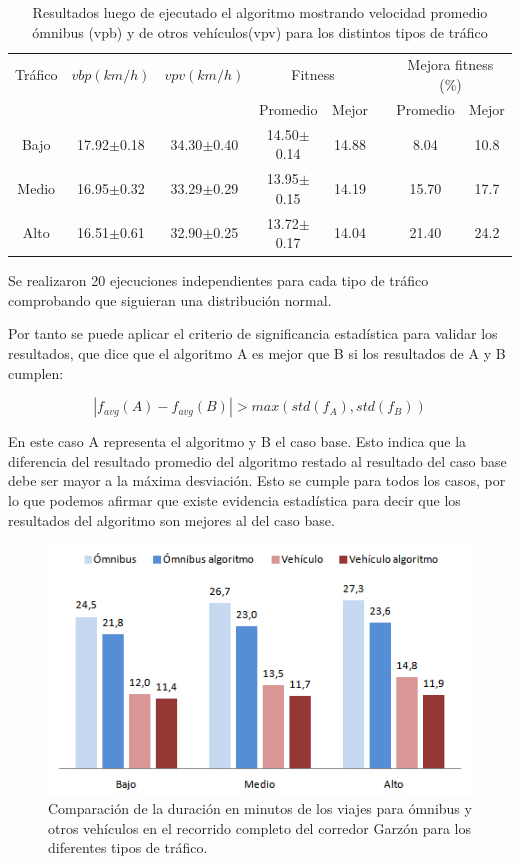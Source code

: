 \begin{table}[H]
	\renewcommand{\arraystretch}{1.2}	
		\centering
	\caption{Resultados luego de ejecutado el algoritmo mostrando velocidad promedio ómnibus (vpb) y  de otros vehículos(vpv) para los distintos tipos de tráfico }
	\label{table:resultado_caso_algoritmo}
	\begin{tabular}{cccccccc}
		\hline 
		Tráfico& 
		$vbp(km/h)$& 
		$vpv(km/h)$&
		\multicolumn{2}{c}{Fitness}&  & 
		\multicolumn{2}{c}{Mejora fitness (\%)}\\  \cline{4-5} \cline{7-8}&     &     & \multicolumn{1}{c}{Promedio} & \multicolumn{1}{c}{Mejor} &  & \multicolumn{1}{c}{Promedio} & \multicolumn{1}{c}{Mejor} \\ \hline
		Bajo & 17.92$\pm$0.18 & 34.30$\pm$0.40 & 14.50$\pm$0.14 & 14.88 & & 8.04 & 10.8  \\
		Medio& 16.95$\pm$0.32 & 33.29$\pm$0.29 & 13.95$\pm$0.15 & 14.19 & & 15.70& 17.7\\ 
		Alto & 16.51$\pm$0.61  & 32.90$\pm$0.25& 13.72$\pm$0.17 & 14.04 & & 21.40& 24.2\\	
		\hline	    
	\end{tabular}
\end{table}

Se realizaron 20 ejecuciones independientes para cada tipo de tráfico comprobando que siguieran una distribución normal.

Por tanto se puede aplicar el criterio de significancia estadística para validar los resultados, que dice que el
algoritmo A es mejor que B si los resultados de A y B cumplen:

\begin{equation}
\label{eq:funcion_significancia}
\left |f_{avg}(A) - f_{avg}(B)  \right | > max(std(f_A),std(f_B))
\end{equation}

En este caso A representa el algoritmo y B el caso base. Esto indica que la diferencia del resultado promedio del algoritmo restado al resultado del caso base debe ser mayor a la máxima desviación.
Esto se cumple para todos los casos, por lo que podemos afirmar que existe evidencia estadística para decir que los resultados del algoritmo son mejores al del caso base.

\begin{figure}[H]
	\centering
	\includegraphics[width=0.8\linewidth]{Figures/duracion_viajes}
	\caption{Comparación de la duración en minutos de los viajes para ómnibus y otros vehículos en el recorrido completo del corredor Garzón para los diferentes tipos de tráfico.}
	\label{fig:duracion_viajes}
\end{figure}

